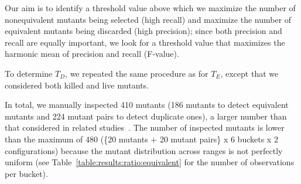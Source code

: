 Our aim is to identify a threshold value above which  we
maximize the number of nonequivalent mutants being selected (high recall) and maximize the number of equivalent mutants being discarded (high precision); since both precision and recall are equally important, we look for a threshold value that maximizes the harmonic mean of precision and recall (F-value).

To determine $T_D$, we repeated the same procedure as for $T_E$, except that we considered both killed and live mutants.

In total, we manually inspected 410 mutants (186 mutants to detect equivalent mutants and 224 mutant pairs to detect duplicate ones), a larger number than that considered in related studies~\cite{schuler2013covering}. The number of inspected mutants is lower than the maximum of 480 (\{20 mutants + 20 mutant pairs\} x 6 buckets x 2 configurations) because the mutant distribution across ranges is not perfectly uniform (see Table~\ref{table:results:ratio:equivalent} for the number of observations per bucket).

